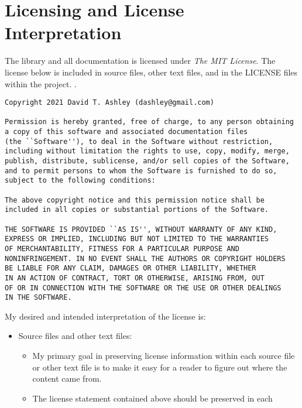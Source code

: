 \section{Licensing and License Interpretation}
\label{ciov0:slip0}

The library and all documentation is licensed under \emph{The MIT License}.
The license below is included in source files, other text files, and in the
LICENSE files within the project.
\emph{\productbasenameshort{}}.

\begin{small}
\begin{verbatim}
Copyright 2021 David T. Ashley (dashley@gmail.com)

Permission is hereby granted, free of charge, to any person obtaining
a copy of this software and associated documentation files
(the ``Software''), to deal in the Software without restriction,
including without limitation the rights to use, copy, modify, merge,
publish, distribute, sublicense, and/or sell copies of the Software,
and to permit persons to whom the Software is furnished to do so,
subject to the following conditions:

The above copyright notice and this permission notice shall be
included in all copies or substantial portions of the Software.

THE SOFTWARE IS PROVIDED ``AS IS'', WITHOUT WARRANTY OF ANY KIND,
EXPRESS OR IMPLIED, INCLUDING BUT NOT LIMITED TO THE WARRANTIES
OF MERCHANTABILITY, FITNESS FOR A PARTICULAR PURPOSE AND
NONINFRINGEMENT. IN NO EVENT SHALL THE AUTHORS OR COPYRIGHT HOLDERS
BE LIABLE FOR ANY CLAIM, DAMAGES OR OTHER LIABILITY, WHETHER
IN AN ACTION OF CONTRACT, TORT OR OTHERWISE, ARISING FROM, OUT
OF OR IN CONNECTION WITH THE SOFTWARE OR THE USE OR OTHER DEALINGS
IN THE SOFTWARE.
\end{verbatim}
\end{small}

My desired and intended interpretation of the license is:

\begin{itemize}
\item Source files and other text files:
      \begin{itemize}
      \item My primary goal in preserving license information within
            each source file or other text file is to make it easy
            for a reader to figure out where the content came from.
      \item The license statement contained above should be preserved
            in each 
      \end{itemize}
\end{itemize}

